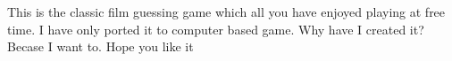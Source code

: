 This is the classic film guessing game which all you have enjoyed playing at free time. I have only ported it to computer based game. Why have I created it? Becase I want to. Hope you like it 